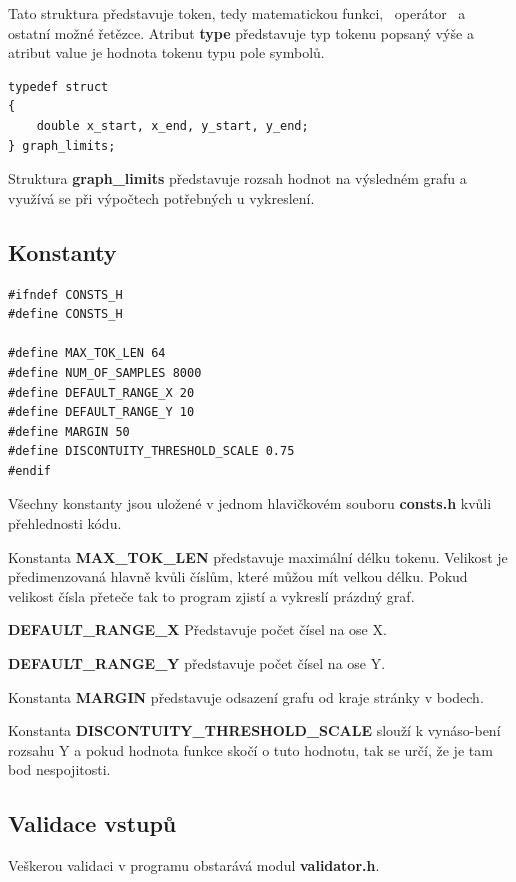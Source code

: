 \documentclass[../main.tex]{subfiles}
\begin{document}
Tato struktura představuje token, tedy matematickou funkci, \ operátor \ a ostatní možné řetězce. Atribut \textbf{type} představuje typ tokenu popsaný výše a atribut value je hodnota tokenu typu pole symbolů.
\begin{lstlisting}
typedef struct
{
    double x_start, x_end, y_start, y_end;
} graph_limits;
\end{lstlisting}

Struktura \textbf{graph\_limits} představuje rozsah hodnot na výsledném grafu a využívá se při výpočtech potřebných u vykreslení.

\subsection{Konstanty}
\begin{lstlisting}
#ifndef CONSTS_H
#define CONSTS_H

#define MAX_TOK_LEN 64
#define NUM_OF_SAMPLES 8000
#define DEFAULT_RANGE_X 20
#define DEFAULT_RANGE_Y 10
#define MARGIN 50
#define DISCONTUITY_THRESHOLD_SCALE 0.75
#endif
\end{lstlisting}

Všechny konstanty jsou uložené v jednom hlavičkovém souboru \textbf{consts.h} kvůli přehlednosti kódu.
\vspace{0.5em}

Konstanta \textbf{MAX\_TOK\_LEN} představuje maximální délku tokenu. Velikost je předimenzovaná hlavně kvůli číslům, které můžou mít velkou délku. Pokud velikost čísla přeteče tak to program zjistí a vykreslí prázdný graf.
\vspace{0.5em}

\textbf{DEFAULT\_RANGE\_X} Představuje počet čísel na ose X.
\vspace{0.5em}

\textbf{DEFAULT\_RANGE\_Y} představuje počet čísel na ose Y.
\vspace{0.5em}

Konstanta \textbf{MARGIN} představuje odsazení grafu od kraje stránky v bodech.
\vspace{0.5em}

Konstanta \textbf{DISCONTUITY\_THRESHOLD\_SCALE} slouží k vynáso-bení rozsahu Y a pokud hodnota funkce skočí o tuto hodnotu, tak se určí, že je tam bod nespojitosti.

\subsection{Validace vstupů}
Veškerou validaci v programu obstarává modul \textbf{validator.h}.
\vspace{0.5em}
\end{document}
